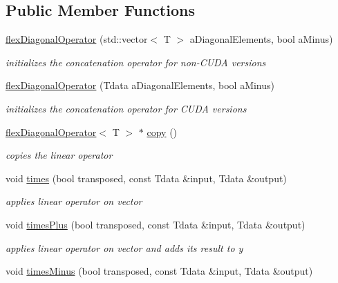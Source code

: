\subsection*{Public Member Functions}
\begin{DoxyCompactItemize}
\item 
\hyperlink{classflex_diagonal_operator_affc1bfd1944ccf07c179ae3d4855f7af}{flex\+Diagonal\+Operator} (std\+::vector$<$ T $>$ a\+Diagonal\+Elements, bool a\+Minus)
\begin{DoxyCompactList}\small\item\em initializes the concatenation operator for non-\/\+C\+U\+DA versions \end{DoxyCompactList}\item 
\hyperlink{classflex_diagonal_operator_a9e39335b75df3ac690aa3899f4a1a5e4}{flex\+Diagonal\+Operator} (Tdata a\+Diagonal\+Elements, bool a\+Minus)
\begin{DoxyCompactList}\small\item\em initializes the concatenation operator for C\+U\+DA versions \end{DoxyCompactList}\item 
\hyperlink{classflex_diagonal_operator}{flex\+Diagonal\+Operator}$<$ T $>$ $\ast$ \hyperlink{classflex_diagonal_operator_aeca7325de5eaface63363e9710034128}{copy} ()
\begin{DoxyCompactList}\small\item\em copies the linear operator \end{DoxyCompactList}\item 
void \hyperlink{classflex_diagonal_operator_a701d4741eb75d3e63fd47b936b46fb8c}{times} (bool transposed, const Tdata \&input, Tdata \&output)
\begin{DoxyCompactList}\small\item\em applies linear operator on vector \end{DoxyCompactList}\item 
void \hyperlink{classflex_diagonal_operator_ab8b9999592b97c6189f7f2c5d3bd47af}{times\+Plus} (bool transposed, const Tdata \&input, Tdata \&output)
\begin{DoxyCompactList}\small\item\em applies linear operator on vector and adds its result to y \end{DoxyCompactList}\item 
void \hyperlink{classflex_diagonal_operator_ac579880d56e9703a5fcb6cafbf9fe338}{times\+Minus} (bool transposed, const Tdata \&input, Tdata \&output)

\end{DoxyCompactItemize}
